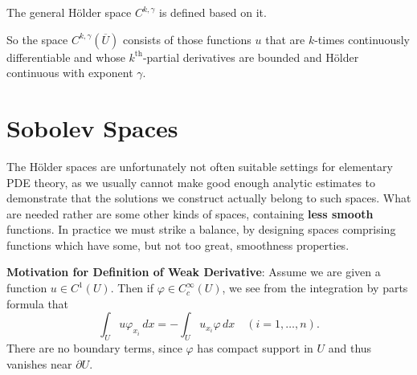 \documentclass[oneside]{book}
\begin{document}
		The general H{\"o}lder space $C^{k,\gamma}$ is defined based on it.
			
			So the space $C^{k,\gamma}(\overline{U})$ consists of those functions $u$ that are $k$-times continuously differentiable and whose $k^{\text{th}}$-partial derivatives are bounded and Hölder
			continuous with exponent $\gamma$.
		\section{Sobolev Spaces}
			The Hölder spaces are unfortunately not often suitable settings for elementary PDE theory, as we usually cannot make good enough analytic estimates to demonstrate that the solutions we construct actually belong
			to such spaces. What are needed rather are some other kinds of spaces, containing \textbf{less smooth} functions. In practice we must strike a balance, by designing
			spaces comprising functions which have some, but not too great, smoothness
			properties.
			
			\textbf{Motivation for Definition of Weak Derivative}:
				Assume we are given a function \( u \in C^1(U) \). Then if \( \varphi \in C_c^\infty(U) \), we see from the integration by parts formula that
				\[
				\int_U u \varphi_{x_i} \, dx = -\int_U u_{x_i} \varphi \, dx \quad (i = 1, \dots, n).
				\]
				There are no boundary terms, since \( \varphi \) has compact support in \( U \) and thus vanishes near \( \partial U \). 
				
\end{document}
